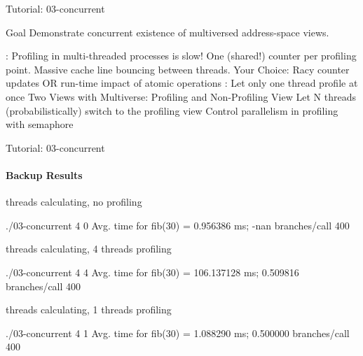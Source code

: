 \RequirePackage{luatex85}\documentclass[beamer,xcolor={table,rgb,dvipsnames}]{beamer}
\begin{document}
\begin{frame}{Tutorial: 03-concurrent}
  \begin{btBlock}{Goal}
    Demonstrate concurrent existence of multiversed address-space views.
  \end{btBlock}

  \bi
  \ii {}: Profiling in multi-threaded processes is slow! {
    \bi
    \ii One (shared!) counter per profiling point.
    \ii Massive cache line bouncing between threads.
    \ii Your Choice: Racy counter updates OR run-time impact of atomic operations
    \ei
  }\qquad
  \ii {}: Let only one thread profile at once {
    \bi
    \ii Two Views with Multiverse: Profiling and Non-Profiling View
    \ii Let N threads (probabilistically) switch to the profiling view
    \ii Control parallelism in profiling with semaphore
    \ei
  }
  \ei


\end{frame}

\begin{frame}[fragile,t]{Tutorial: 03-concurrent}
  \framesubtitle{Backup Results}

  \bi
   threads calculating, no profiling
      \begin{code}[]
        \begin{codetext}
          ./03-concurrent 4 0
          Avg. time for fib(30) = 0.956386 ms; -nan branches/call 400
        \end{codetext}
      \end{code}

    threads calculating, 4 threads profiling
      \begin{code}[]
        \begin{codetext}
          ./03-concurrent 4 4
          Avg. time for fib(30) = 106.137128 ms; 0.509816 branches/call 400
        \end{codetext}
      \end{code}
     threads calculating, 1 threads profiling
      \begin{code}[]
        \begin{codetext}
          ./03-concurrent 4 1
          Avg. time for fib(30) = 1.088290 ms; 0.500000 branches/call 400
        \end{codetext}
      \end{code}
\ei  
\end{frame}
\end{document}
